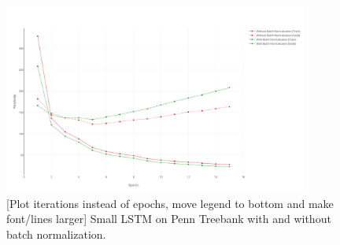 \documentclass{article}
\begin{document}
\begin{figure}[t]
  \centering
  \includegraphics[width=100mm]{ptb_small_norm_plot.png}
  \caption{[Plot iterations instead of epochs, move legend to bottom and make font/lines larger] Small LSTM on Penn Treebank with and without batch normalization.}
  \label{overflow}
\end{figure}
\end{document}
